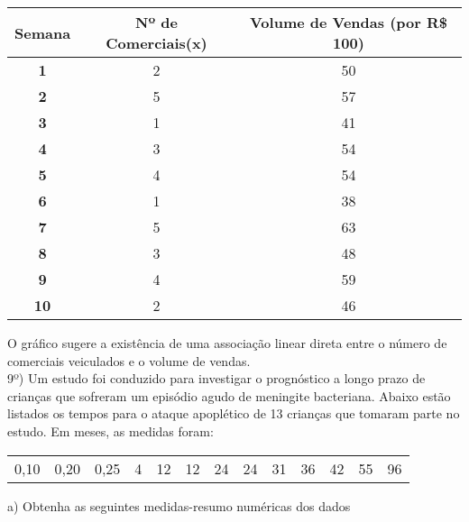 \documentclass[12pt,a4paper]{article}
\begin{document}
	\begin{center}
		\begin{tabular}{|c|c|c|} \hline
			\textbf{Semana} & \textbf{Nº de Comerciais(x)} & \textbf{Volume de Vendas (por R\$ 100)}\\ \hline
			\textbf{1} & 2 & 50\\ \hline
			\textbf{2} & 5 & 57\\ \hline
			\textbf{3} & 1 & 41\\ \hline
			\textbf{4} & 3 & 54\\ \hline
			\textbf{5} & 4 & 54\\ \hline
			\textbf{6} & 1 & 38\\ \hline
			\textbf{7} & 5 & 63\\ \hline
			\textbf{8} & 3 & 48\\ \hline
			\textbf{9} & 4 & 59\\ \hline
			\textbf{10} & 2 & 46\\ \hline
		\end{tabular}
	\end{center}
	\vspace{0.5cm}
	O gráfico sugere a existência de uma associação linear direta entre o número de comerciais veiculados e o volume de vendas.
	\vspace{1cm}\\
	9º) Um estudo foi conduzido para investigar o prognóstico a longo prazo de crianças que	sofreram um episódio agudo de meningite bacteriana. Abaixo estão listados os tempos para o ataque apoplético de 13 crianças que tomaram parte no estudo. Em meses, as medidas foram:
	\begin{center}
		\begin{tabular}{ccccccccccccc}
			0,10 & 0,20 & 0,25 & 4 & 12 & 12 & 24 &	24 & 31 & 36 & 42 & 55 & 96
		\end{tabular}
	\end{center}
	\vspace{0.5cm}
	a) Obtenha as seguintes medidas-resumo numéricas dos dados\\
\end{document}
